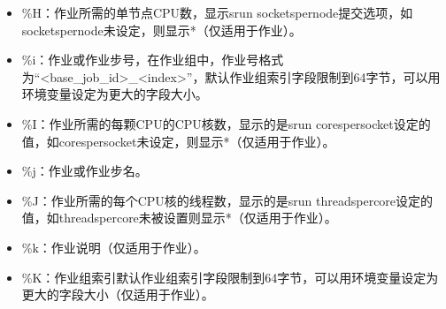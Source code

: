\documentclass[a4paper,12pt,english]{sphinxmanual}
\begin{document}
\begin{itemize}
\begin{itemize}
\begin{itemize}
\begin{itemize}
\item {} 
\sphinxAtStartPar
NO：如果作业所需排他性运行。

\item {} 
\sphinxAtStartPar
USER：如果分配的计算节点设定为单个用户。

\item {} 
\sphinxAtStartPar
MCS：如果分配的计算节点设定为单个安全类（参看MCSPlugin和MCSParameters配置参数，Multi\sphinxhyphen{}Category Security）。

\item {} 
\sphinxAtStartPar
OK：其它（典型的分配给专用的CPU）（仅适用于作业）。

\end{itemize}

\item {} 
\sphinxAtStartPar
\%H：作业所需的单节点CPU数，显示srun \sphinxhyphen{}\sphinxhyphen{}sockets\sphinxhyphen{}per\sphinxhyphen{}node提交选项，如\sphinxhyphen{}\sphinxhyphen{}sockets\sphinxhyphen{}per\sphinxhyphen{}node未设定，则显示*（仅适用于作业）。

\item {} 
\sphinxAtStartPar
\%i：作业或作业步号，在作业组中，作业号格式为“<base\_job\_id>\_<index>”，默认作业组索引字段限制到64字节，可以用环境变量设定为更大的字段大小。

\item {} 
\sphinxAtStartPar
\%I：作业所需的每颗CPU的CPU核数，显示的是srun \sphinxhyphen{}\sphinxhyphen{}cores\sphinxhyphen{}per\sphinxhyphen{}socket设定的值，如\sphinxhyphen{}\sphinxhyphen{}cores\sphinxhyphen{}per\sphinxhyphen{}socket未设定，则显示*（仅适用于作业）。

\item {} 
\sphinxAtStartPar
\%j：作业或作业步名。

\item {} 
\sphinxAtStartPar
\%J：作业所需的每个CPU核的线程数，显示的是srun \sphinxhyphen{}\sphinxhyphen{}threads\sphinxhyphen{}per\sphinxhyphen{}core设定的值，如\sphinxhyphen{}\sphinxhyphen{}threads\sphinxhyphen{}per\sphinxhyphen{}core未被设置则显示*（仅适用于作业）。

\item {} 
\sphinxAtStartPar
\%k：作业说明（仅适用于作业）。

\item {} 
\sphinxAtStartPar
\%K：作业组索引默认作业组索引字段限制到64字节，可以用环境变量设定为更大的字段大小（仅适用于作业）。


\end{itemize}
\end{itemize}
\end{itemize}
\end{document}
